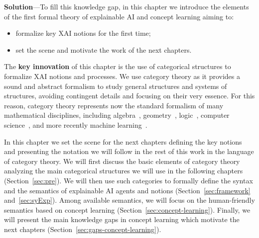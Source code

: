 \textbf{Solution}---To fill this knowledge gap, in this chapter we introduce the elements of the first formal theory of explainable AI and concept learning aiming to:
\begin{itemize}
    \item formalize key XAI notions for the first time;
    \item set the scene and motivate the work of the next chapters.
\end{itemize}
The \textbf{key innovation} of this chapter is the use of categorical structures to formalize XAI notions and processes.
We use category theory as it provides a sound and abstract formalism to study general structures and systems of structures, avoiding contingent details and focusing on their very essence. For this reason, category theory represents now the standard formalism of many mathematical disciplines, including algebra~\cite{eilenberg1945general}, geometry~\cite{bredon2012sheaf}, logic~\cite{johnstone2014topos}, computer science~\cite{goguen1992institutions}, and more recently machine learning~\cite{cruttwell2022categorical,ong2022learnable}.

In this chapter we set the scene for the next chapters defining the key notions and presenting the notation we will follow in the rest of this work in the language of category theory. We will first discuss the basic elements of category theory analyzing the main categorical structures we will use in the following chapters (Section~\ref{sec:pre}). We will then use such categories to formally define the syntax and the semantics of explainable AI agents and notions (Section~\ref{sec:framework} and~\ref{sec:syExp}). Among available semantics, we will focus on the human-friendly semantics based on concept learning (Section~\ref{sec:concept-learning}). Finally, we will present the main knowledge gaps in concept learning which motivate the next chapters (Section~\ref{sec:gaps-concept-learning}).



